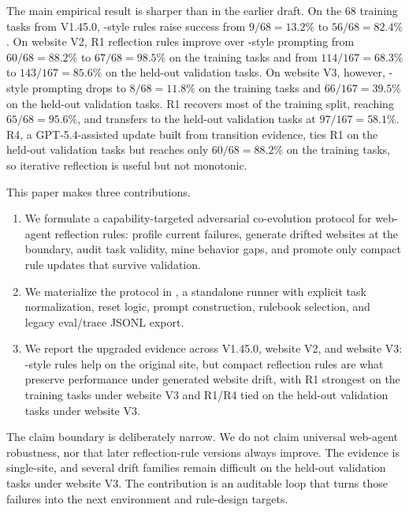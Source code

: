 The main empirical result is sharper than in the earlier draft. On the 68 training tasks from \linkding{} V1.45.0, \expel{}-style rules raise success from \(9/68=13.2\%\) to \(56/68=82.4\%\). On website V2, R1 reflection rules improve over \expel{}-style prompting from \(60/68=88.2\%\) to \(67/68=98.5\%\) on the training tasks and from \(114/167=68.3\%\) to \(143/167=85.6\%\) on the held-out validation tasks. On website V3, however, \expel{}-style prompting drops to \(8/68=11.8\%\) on the training tasks and \(66/167=39.5\%\) on the held-out validation tasks. R1 recovers most of the training split, reaching \(65/68=95.6\%\), and transfers to the held-out validation tasks at \(97/167=58.1\%\). R4, a GPT-5.4-assisted update built from transition evidence, ties R1 on the held-out validation tasks but reaches only \(60/68=88.2\%\) on the training tasks, so iterative reflection is useful but not monotonic.

This paper makes three contributions.
\begin{enumerate}
\item We formulate a capability-targeted adversarial co-evolution protocol for web-agent reflection rules: profile current failures, generate drifted websites at the boundary, audit task validity, mine behavior gaps, and promote only compact rule updates that survive validation.
\item We materialize the protocol in \webcoevo{}, a standalone \linkding{} runner with explicit task normalization, reset logic, prompt construction, rulebook selection, and legacy eval/trace JSONL export.
\item We report the upgraded evidence across \linkding{} V1.45.0, website V2, and website V3: \expel{}-style rules help on the original site, but compact reflection rules are what preserve performance under generated website drift, with R1 strongest on the training tasks under website V3 and R1/R4 tied on the held-out validation tasks under website V3.
\end{enumerate}

The claim boundary is deliberately narrow. We do not claim universal web-agent robustness, nor that later reflection-rule versions always improve. The evidence is single-site, and several drift families remain difficult on the held-out validation tasks under website V3. The contribution is an auditable loop that turns those failures into the next environment and rule-design targets.
